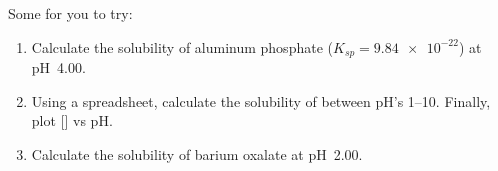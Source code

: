 \documentclass[notes=onlyslideswithnotes,notes=hide]{beamer}
\begin{document}


\begin{frame}{Some for you to try:}
	\begin{enumerate}
		\item Calculate the solubility of aluminum phosphate ($K_{sp} =
			\num{9.84e-22}$) at pH~4.00.
		\item Using a spreadsheet, calculate the solubility of 
			between pH's 1--10. Finally, plot [] vs pH.
		\item Calculate the solubility of barium oxalate at pH~2.00.
	\end{enumerate}
\end{frame}
\end{document}
